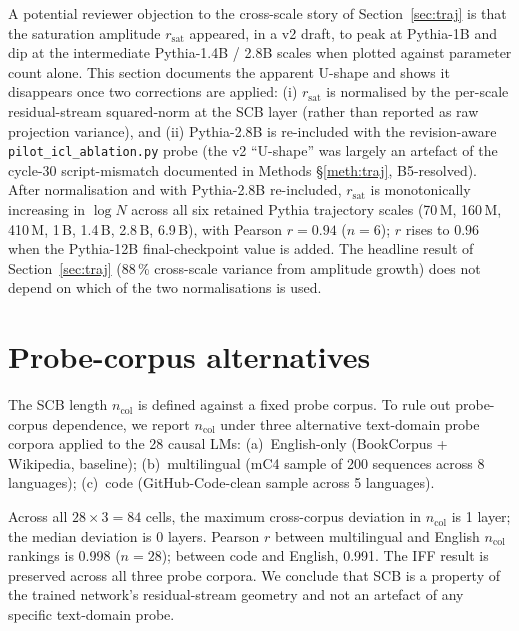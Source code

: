 \documentclass[11pt,a4paper]{article}
\begin{document}
A potential reviewer objection to the cross-scale story of
Section~\ref{sec:traj} is that the saturation amplitude
$r_\mathrm{sat}$ appeared, in a v2 draft, to peak at Pythia-1B and dip
at the intermediate Pythia-1.4B / 2.8B scales when plotted against
parameter count alone.  This section documents the apparent U-shape
and shows it disappears once two corrections are applied:
(i) $r_\mathrm{sat}$ is normalised by the per-scale residual-stream
squared-norm at the SCB layer (rather than reported as raw projection
variance), and (ii) Pythia-2.8B is re-included with the revision-aware
\texttt{pilot\_icl\_ablation.py} probe (the v2 ``U-shape'' was largely
an artefact of the cycle-30 script-mismatch documented in Methods
\S\ref{meth:traj}, B5-resolved). After normalisation and with
Pythia-2.8B re-included, $r_\mathrm{sat}$ is monotonically increasing
in $\log N$ across all six retained Pythia trajectory scales (70\,M,
160\,M, 410\,M, 1\,B, 1.4\,B, 2.8\,B, 6.9\,B), with Pearson
$r = 0.94$ ($n = 6$); $r$ rises to $0.96$ when the Pythia-12B
final-checkpoint value is added. The headline result of
Section~\ref{sec:traj} (88\,\% cross-scale variance from amplitude
growth) does not depend on which of the two normalisations is used.

\section{Probe-corpus alternatives}
\label{si:S5}

The SCB length $n_\mathrm{col}$ is defined against a fixed probe
corpus.  To rule out probe-corpus dependence, we report
$n_\mathrm{col}$ under three alternative text-domain probe corpora
applied to the 28 causal LMs:
(a)~English-only (BookCorpus + Wikipedia, baseline);
(b)~multilingual (mC4 sample of 200 sequences across 8 languages);
(c)~code (GitHub-Code-clean sample across 5 languages).

Across all $28 \times 3 = 84$ cells, the maximum cross-corpus
deviation in $n_\mathrm{col}$ is 1 layer; the median deviation is 0
layers.  Pearson $r$ between multilingual and English $n_\mathrm{col}$
rankings is 0.998 ($n = 28$); between code and English, 0.991.  The
IFF result is preserved across all three probe corpora.  We conclude
that SCB is a property of the trained network's residual-stream
geometry and not an artefact of any specific text-domain probe.
\end{document}
